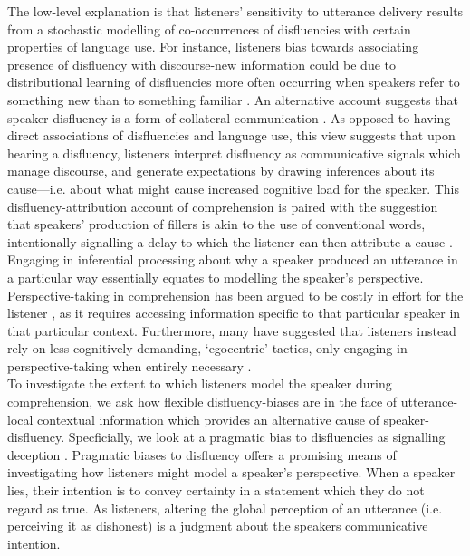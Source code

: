 \documentclass[man]{apa6}
\begin{document}
The low-level explanation is that listeners' sensitivity to utterance delivery results from a stochastic modelling of co-occurrences of disfluencies with certain properties of language use. 
For instance, listeners bias towards associating presence of disfluency with discourse-new information could be due to distributional learning of disfluencies more often occurring when speakers refer to something new than to something familiar \citep{Arnold2004, Barr2001}. 
An alternative account suggests that speaker-disfluency is a form of collateral communication \citep{Clark1996}. 
As opposed to having direct associations of disfluencies and language use, this view suggests that upon hearing a disfluency, listeners interpret disfluency as communicative signals which manage discourse, and generate expectations by drawing inferences about its cause---i.e. about what might cause increased cognitive load for the speaker. 
This disfluency-attribution account of comprehension is paired with the suggestion that speakers' production of fillers is akin to the use of conventional words, intentionally signalling a delay to which the listener can then attribute a cause \citep{Clark2002}. 
Engaging in inferential processing about why a speaker produced an utterance in a particular way essentially equates to modelling the speaker's perspective.
Perspective-taking in comprehension has been argued to be costly in effort for the listener \citep{Lin2010}, as it requires accessing information specific to that particular speaker in that particular context. 
Furthermore, many have suggested that listeners instead rely on less cognitively demanding, `egocentric' tactics, only engaging in perspective-taking when entirely necessary \citep{Barr2002, Barr2004, Barr2014, Pickering2004, Kronmuller2007}.\\


















To investigate the extent to which listeners model the speaker during comprehension, we ask how flexible disfluency-biases are in the face of utterance-local contextual information which provides an alternative cause of speaker-disfluency. 
Specficially, we look at a pragmatic bias to disfluencies as signalling deception \citep{Loy2016}. 
Pragmatic biases to disfluency offers a promising means of investigating how listeners might model a speaker's perspective. 
When a speaker lies, their intention is to convey certainty in a statement which they do not regard as true. 
As listeners, altering the global perception of an utterance (i.e. perceiving it as dishonest) is a judgment about the speakers communicative intention. 
\end{document}
